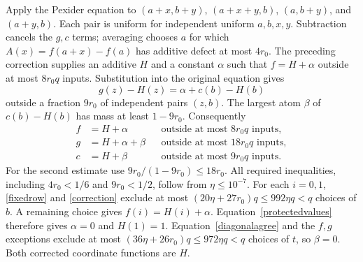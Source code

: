 \documentclass[11pt]{article}
\begin{document}
Apply the Pexider equation to
$(a+x,b+y)$, $(a+x+y,b)$, $(a,b+y)$, and $(a+y,b)$.
Each pair is uniform for independent uniform $a,b,x,y$. Subtraction
cancels the $g,c$ terms; averaging chooses $a$ for which
$A(x)=f(a+x)-f(a)$ has additive defect at most $4r_0$.
The preceding correction supplies an additive $H$ and a constant
$\alpha$ such that $f=H+\alpha$ outside at most $8r_0q$ inputs.
Substitution into the original equation gives
\[
 g(z)-H(z)=\alpha+c(b)-H(b)
\]
outside a fraction $9r_0$ of independent pairs $(z,b)$. The largest atom
$\beta$ of $c(b)-H(b)$ has mass at least $1-9r_0$. Consequently
\begin{equation}\label{correction}
\begin{aligned}
 f&=H+\alpha &&\text{outside at most }8r_0q\text{ inputs},\\
 g&=H+\alpha+\beta &&\text{outside at most }18r_0q\text{ inputs},\\
 c&=H+\beta &&\text{outside at most }9r_0q\text{ inputs}.
\end{aligned}
\end{equation}
For the second estimate use $9r_0/(1-9r_0)\leq18r_0$.
All required inequalities, including $4r_0<1/6$ and $9r_0<1/2$,
follow from $\eta\leq10^{-7}$.
For each $i=0,1$, \eqref{fixedrow} and \eqref{correction} exclude at
most $(20\eta+27r_0)q\leq992\eta q<q$ choices of $b$. A remaining
choice gives $f(i)=H(i)+\alpha$. Equation~\eqref{protectedvalues}
therefore gives $\alpha=0$ and $H(1)=1$. Equation~\eqref{diagonalagree}
and the $f,g$ exceptions exclude at most
$(36\eta+26r_0)q\leq972\eta q<q$ choices of $t$, so $\beta=0$.
Both corrected coordinate functions are $H$.
\end{document}
